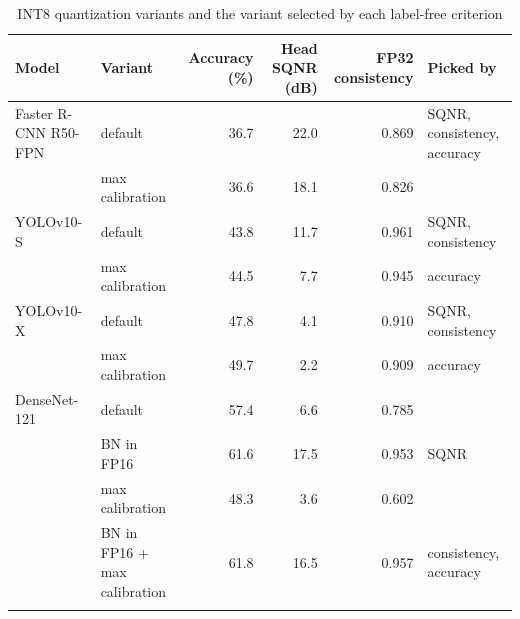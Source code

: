 \documentclass[pdflatex,sn-mathphys-num]{sn-jnl}%
\theoremstyle{thmstyleone}%
\theoremstyle{thmstyletwo}%
\theoremstyle{thmstylethree}%
\begin{document}
\begin{appendices}
\begin{table}
\footnotesize\setlength{\tabcolsep}{4pt}
\caption{INT8 quantization variants and the variant selected by each label-free criterion}\label{tab:placement}
\begin{tabular}{@{}llrrrl@{}}
\toprule
Model & Variant & Accuracy (\%) & Head SQNR (dB) & FP32 consistency & Picked by \\
\midrule
Faster R-CNN R50-FPN & default & 36.7 & 22.0 & 0.869 & SQNR, consistency, accuracy \\
 & max calibration & 36.6 & 18.1 & 0.826 &  \\
\midrule
YOLOv10-S & default & 43.8 & 11.7 & 0.961 & SQNR, consistency \\
 & max calibration & 44.5 & 7.7 & 0.945 & accuracy \\
\midrule
YOLOv10-X & default & 47.8 & 4.1 & 0.910 & SQNR, consistency \\
 & max calibration & 49.7 & 2.2 & 0.909 & accuracy \\
\midrule
DenseNet-121 & default & 57.4 & 6.6 & 0.785 &  \\
 & BN in FP16 & 61.6 & 17.5 & 0.953 & SQNR \\
 & max calibration & 48.3 & 3.6 & 0.602 &  \\
 & BN in FP16 + max calibration & 61.8 & 16.5 & 0.957 & consistency, accuracy \\
\botrule
\end{tabular}
\end{table}


\end{appendices}
\end{document}
